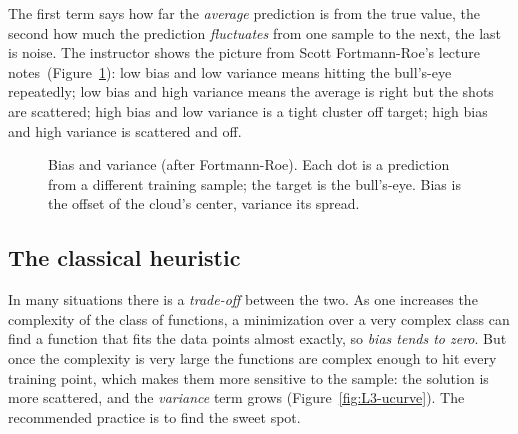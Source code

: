 The first term says how far the \emph{average} prediction is from the true value, the second how much the prediction \emph{fluctuates} from one sample to the next, the last is noise. The instructor shows the picture from Scott Fortmann-Roe's lecture notes\,\citep{fortmannroe2012} (Figure~\ref{fig:L3-bullseye}): low bias and low variance means hitting the bull's-eye repeatedly; low bias and high variance means the average is right but the shots are scattered;
high bias and low variance is a tight cluster off target; high bias and high variance is scattered and off.

\begin{figure}[tb]
\centering
{}
\caption{Bias and variance (after Fortmann-Roe). Each dot is a prediction from a different training sample; the target is the bull's-eye. Bias is the offset of the cloud's center, variance its spread.}
\label{fig:L3-bullseye}
\end{figure}

\subsection{The classical heuristic}\label{sec:L3-heuristic}
In many situations there is a \emph{trade-off} between the two. As one increases the complexity of the class of functions, a minimization over a very complex class can find a function that fits the data points almost exactly, so \emph{bias tends to zero}. But once the complexity is very large the functions are complex enough to hit every training point, which makes them more sensitive to the sample: the solution is more scattered, and the \emph{variance} term grows (Figure~\ref{fig:L3-ucurve}).
The recommended practice is to find the sweet spot.

